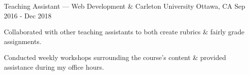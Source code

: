 \begin{cventries}
	\cventry
		{Teaching Assistant --- Web Development \& }
		{Carleton University}
		{Ottawa, CA}
		{Sep 2016 - Dec 2018}
		{\begin{cvitems}
			\item Collaborated with other teaching assistants to both create rubrics \& fairly grade assignments.
			\item Conducted weekly workshops surrounding the course's content \& provided assistance during my office hours.
		\end{cvitems}}
\end{cventries}
